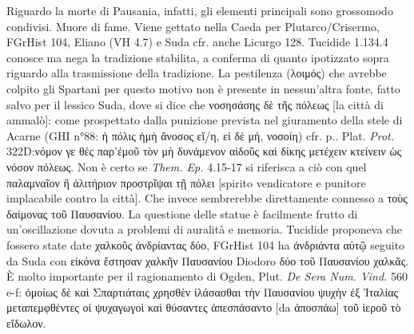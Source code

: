 {            Riguardo la morte di Pausania, infatti, gli elementi principali sono grossomodo condivisi. Muore di fame. Viene gettato nella Caeda per Plutarco/Crisermo, FGrHist 104, Eliano (VH 4.7) e Suda cfr. anche Licurgo  128.  Tucidide 1.134.4 conosce ma nega la tradizione stabilita, a conferma di quanto ipotizzato sopra riguardo alla trasmissione della tradizione. La pestilenza (\textgreek{λοιμός}) che avrebbe colpito gli Spartani per questo motivo non è presente in nessun'altra fonte, fatto salvo per il lessico Suda, dove si dice che  \textgreek{νοσησάσης δὲ τῆς πόλεως} [la città di ammalò]: come prospettato dalla punizione prevista nel giuramento della stele di Acarne (GHI n°88: \textgreek{ἡ πόλις ἡμὴ ἄνοσος εἴ/η, εἰ δὲ μή, νοσοίη}) cfr. p.\pageref{ref:stelediacarne}. Plat. \emph{Prot.} 322D:\textgreek{νόμον γε θές παρ’ἐμοῦ τὸν μὴ δυνάμενον αἰδοῦς καὶ δίκης μετέχειν κτείνειν ὡς νόσον πόλεως.} Non è certo se \emph{Them. Ep.}  4.15-17 si riferisca a ciò con quel  \textgreek{παλαμναῖον ἢ ἀλιτήριον προστρῖψαι τῇ πόλει} [spirito vendicatore e punitore implacabile contro la città]. Che invece sembrerebbe direttamente connesso a \textgreek{τοὺς δαίμονας τοῦ Παυσανίου}. La questione delle statue è facilmente frutto di un'oscillazione dovuta a problemi di auralità e memoria. Tucidide proponeva che fossero state date \textgreek{χαλκοῦς ἀνδρίαντας δύο}, FGrHist 104 ha \textgreek{ἀνδριάντα αὐτῷ} seguito da Suda con \textgreek{εἰκόνα ἔστησαν χαλκῆν Παυσανίου}  Diodoro \textgreek{δύο τοῦ Παυσανίου χαλκᾶς}. È molto importante per il ragionamento di Ogden, Plut. \emph{De Sera Num. Vind.} 560 e-f: \textgreek{ὀμοίως δὲ καὶ Σπαρτιάταις χρησθὲν ἱλάσασθαι τὴν Παυσανίου ψυχὴν ἐξ Ἰταλίας μεταπεμφθέντες οἱ ψυχαγωγοὶ καὶ θύσαντες ἀπεσπάσαντο [da ἀποσπάω] τοῦ ἱεροῦ τὸ εἴδωλον}.
}
